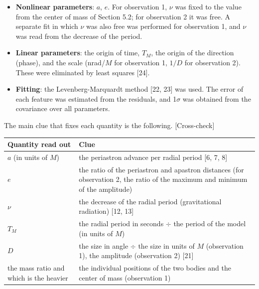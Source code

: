 \documentclass[
  a4paper,
]{article}
\newcounter{none} %
\providecommand{\tightlist}{%
  \setlength{\itemsep}{0pt}\setlength{\parskip}{0pt}}
\begin{document}
\begin{itemize}
\tightlist
\item
  \textbf{Nonlinear parameters}: \(a\), \(e\). For observation 1,
  \(\nu\) was fixed to the value from the center of mass of Section 5.2;
  for observation 2 it was free. A separate fit in which \(\nu\) was
  also free was performed for observation 1, and \(\nu\) was read from
  the decrease of the period.
\item
  \textbf{Linear parameters}: the origin of time, \(T_M\), the origin of
  the direction (phase), and the scale (nrad/\(M\) for observation 1,
  \(1/D\) for observation 2). These were eliminated by least squares
  {[}24{]}.
\item
  \textbf{Fitting}: the Levenberg-Marquardt method {[}22, 23{]} was
  used. The error of each feature was estimated from the residuals, and
  1\(\sigma\) was obtained from the covariance over all parameters.
\end{itemize}

The main clue that fixes each quantity is the following.
{[}Cross-check{]}

{\def\LTcaptype{none} %
\begin{longtable}[]{@{}
  >{\raggedright\arraybackslash}p{}
  >{\raggedright\arraybackslash}p{}@{}}
\toprule\noalign{}
\begin{minipage}[b]{\linewidth}\raggedright
Quantity read out
\end{minipage} & \begin{minipage}[b]{\linewidth}\raggedright
Clue
\end{minipage} \\
\midrule\noalign{}
\endhead
\bottomrule\noalign{}
\endlastfoot
\(a\) (in units of \(M\)) & the periastron advance per radial period
{[}6, 7, 8{]} \\
\(e\) & the ratio of the periastron and apastron distances (for
observation 2, the ratio of the maximum and minimum of the amplitude) \\
\(\nu\) & the decrease of the radial period (gravitational radiation)
{[}12, 13{]} \\
\(T_M\) & the radial period in seconds \(\div\) the period of the model
(in units of \(M\)) \\
\(D\) & the size in angle \(\div\) the size in units of \(M\)
(observation 1), the amplitude (observation 2) {[}21{]} \\
the mass ratio and which is the heavier & the individual positions of
the two bodies and the center of mass (observation 1) \\
\end{longtable}
}
\end{document}
